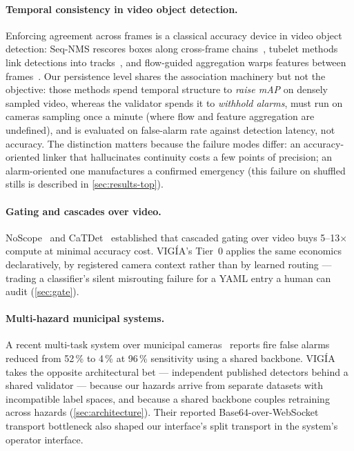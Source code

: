 \paragraph{Temporal consistency in video object detection.}
Enforcing agreement across frames is a classical accuracy device in video
object detection: Seq-NMS rescores boxes along cross-frame
chains~\citep{han2016seqnms}, tubelet methods link detections into
tracks~\citep{kang2017tcnn}, and flow-guided aggregation warps features
between frames~\citep{zhu2017fgfa}. Our persistence level shares the
association machinery but not the objective: those methods spend temporal
structure to \emph{raise mAP} on densely sampled video, whereas the
validator spends it to \emph{withhold alarms}, must run on cameras sampling
once a minute (where flow and feature aggregation are undefined), and is
evaluated on false-alarm rate against detection latency, not
accuracy. The distinction matters because the failure modes differ: an
accuracy-oriented linker that hallucinates continuity costs a few points of
precision; an alarm-oriented one manufactures a confirmed emergency
(this failure on shuffled stills is described in \cref{sec:results-top}).

\paragraph{Gating and cascades over video.} NoScope~\citep{kang2017noscope}
and CaTDet~\citep{mao2018catdet} established that cascaded gating over video
buys 5--13$\times$ compute at minimal accuracy cost. VIGÍA's Tier~0 applies
the same economics declaratively, by registered camera context rather than
by learned routing — trading a classifier's silent misrouting failure for a
YAML entry a human can audit (\cref{sec:gate}).

\paragraph{Multi-hazard municipal systems.} A recent multi-task system over
municipal cameras~\citep{multitasksystem} reports fire false alarms reduced
from 52\,\% to 4\,\% at 96\,\% sensitivity using a shared backbone. VIGÍA
takes the opposite architectural bet — independent published detectors behind
a shared validator — because our hazards arrive from separate datasets with
incompatible label spaces, and because a shared backbone couples retraining
across hazards (\cref{sec:architecture}). Their reported Base64-over-WebSocket
transport bottleneck also shaped our interface's split transport
in the system's operator interface.

